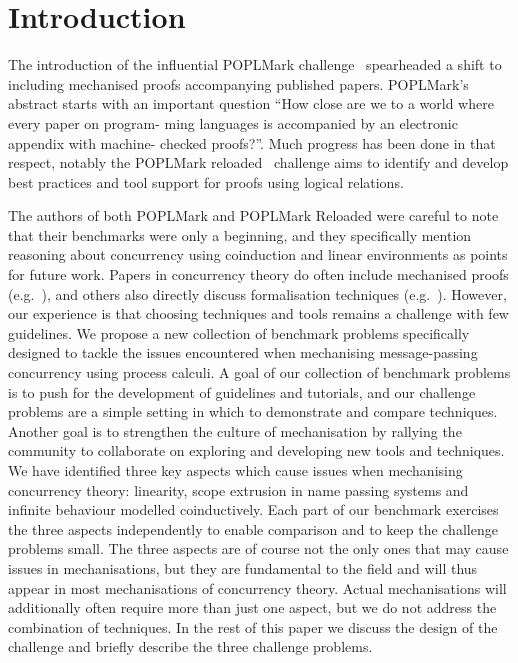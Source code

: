 \documentclass[runningheads]{llncs}
\begin{document}
\section{Introduction}


The introduction of the influential POPLMark challenge~\cite{POPLMark}
spearheaded a shift to including mechanised proofs accompanying
published papers. POPLMark's abstract starts with an important
question ``How close are we to a world where every paper on program-
ming languages is accompanied by an electronic appendix with machine-
checked proofs?''. Much progress has been done in that respect,
notably the POPLMark reloaded~\cite{POPLMarkReloaded} challenge aims
to identify and develop best practices and tool support for proofs
using logical relations.

The authors of both POPLMark and POPLMark Reloaded
were careful to note that their benchmarks were only a beginning, and
they specifically mention reasoning about concurrency using
coinduction and linear environments as points for future work. Papers
in concurrency theory do often include mechanised proofs
(e.g.~\cite{DBLP:conf/pldi/Castro-Perez0GY21,DBLP:conf/tacas/CastroFY20,lmcs:9985,
  DBLP:journals/jar/CruzFilipeMP23, Tirore:2023}), and others also
directly discuss formalisation techniques
(e.g.~\cite{DBLP:journals/jar/BengtsonPW16, DBLP:conf/tphol/Gay01,
  DBLP:conf/ppdp/Thiemann19, DBLP:conf/forte/ZalakainD21}). However,
our experience is that choosing techniques and tools remains a
challenge with few guidelines. We propose a new collection of
benchmark problems specifically designed to tackle the issues
encountered when mechanising message-passing concurrency using process
calculi. A goal of our collection of benchmark problems is to push for
the development of guidelines and tutorials, and our challenge
problems are a simple setting in which to demonstrate and compare
techniques. Another goal is to strengthen the culture of mechanisation
by rallying the community to collaborate on exploring and developing
new tools and techniques. We have identified three key aspects which
cause issues when mechanising concurrency theory: linearity, scope
extrusion in name passing systems and infinite behaviour modelled
coinductively. Each part of our benchmark exercises the three aspects
independently to enable comparison and to keep the challenge problems
small. The three aspects are of course not the only ones that may
cause issues in mechanisations, but they are fundamental to the field
and will thus appear in most mechanisations of concurrency theory.
Actual mechanisations will additionally often require more than just
one aspect, but we do not address the combination of techniques. In
the rest of this paper we discuss the design of the challenge and
briefly describe the three challenge problems.
\end{document}

